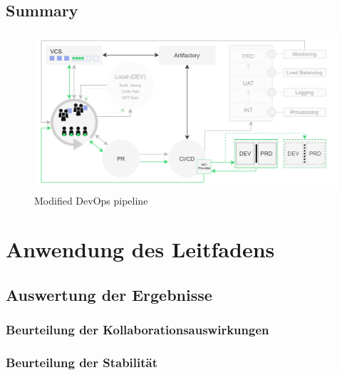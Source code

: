 \documentclass[11pt]{article}
\begin{document}
\subsection{Summary}
\begin{figure}[H]
\caption{Modified DevOps pipeline}
\label{fig:devopsModified}
\centering
\includegraphics[width=1\textwidth]{DevOps modified}
\end{figure}
\newpage
\section{Anwendung des Leitfadens}
\subsection{Auswertung der Ergebnisse}
\subsubsection{Beurteilung der Kollaborationsauswirkungen}
\subsubsection{Beurteilung der Stabilität}
\end{document}
